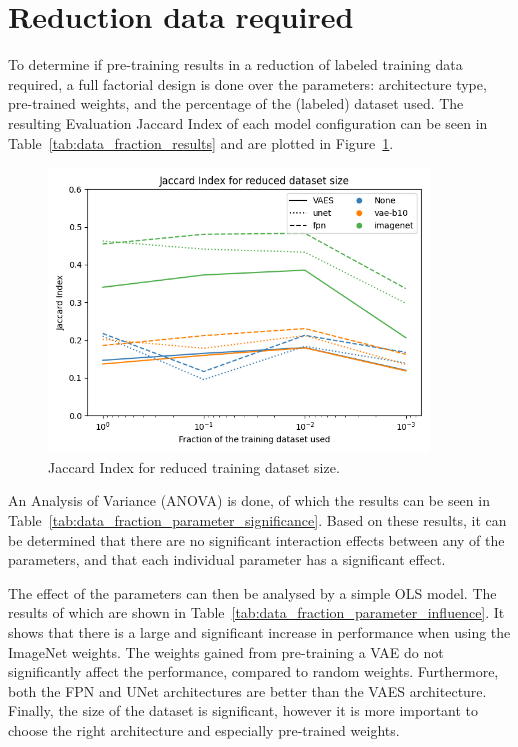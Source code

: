 

\section{Reduction data required}
To determine if pre-training results in a reduction of labeled training data required, a full factorial design is done over the parameters: architecture type, pre-trained weights, and the percentage of the (labeled) dataset used. The resulting Evaluation Jaccard Index of each model configuration can be seen in Table~\ref{tab:data_fraction_results} and are plotted in Figure~\ref{fig:dataset-fraction-results}.


\begin{figure}[h]
    \centering
    \includegraphics[width=0.9\textwidth]{figures/data_percentage/line-plot.png}
    \caption{Jaccard Index for reduced training dataset size.}
    \label{fig:dataset-fraction-results}
\end{figure}

An Analysis of Variance (ANOVA) is done, of which the results can be seen in Table~\ref{tab:data_fraction_parameter_significance}. Based on these results, it can be determined that there are no significant interaction effects between any of the parameters, and that each individual parameter has a significant effect.


The effect of the parameters can then be analysed by a simple OLS model. The results of which are shown in Table~\ref{tab:data_fraction_parameter_influence}. It shows that there is a large and significant increase in performance when using the ImageNet weights. The weights gained from pre-training a VAE do not significantly affect the performance, compared to random weights. Furthermore, both the FPN and UNet architectures are better than the VAES architecture. Finally, the size of the dataset is significant, however it is more important to choose the right architecture and especially pre-trained weights.


